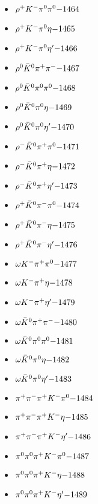 \begin{multicols}{3}
\begin{itemize}
 \item $ \rho^{+} K^{-} \pi^{0} \pi^{0} \hfill{-1464}$
 \item $ \rho^{+} K^{-} \pi^{0} \eta \hfill{-1465}$
 \item $ \rho^{+} K^{-} \pi^{0} {\eta^{\prime}} \hfill{-1466}$
 \item $ \rho^{0} \bar{K}^{0} \pi^{+} \pi^{-} \hfill{-1467}$
 \item $ \rho^{0} \bar{K}^{0} \pi^{0} \pi^{0} \hfill{-1468}$
 \item $ \rho^{0} \bar{K}^{0} \pi^{0} \eta \hfill{-1469}$
 \item $ \rho^{0} \bar{K}^{0} \pi^{0} {\eta^{\prime}} \hfill{-1470}$
 \item $ \rho^{-} \bar{K}^{0} \pi^{+} \pi^{0} \hfill{-1471}$
 \item $ \rho^{-} \bar{K}^{0} \pi^{+} \eta \hfill{-1472}$
 \item $ \rho^{-} \bar{K}^{0} \pi^{+} {\eta^{\prime}} \hfill{-1473}$
 \item $ \rho^{+} \bar{K}^{0} \pi^{-} \pi^{0} \hfill{-1474}$
 \item $ \rho^{+} \bar{K}^{0} \pi^{-} \eta \hfill{-1475}$
 \item $ \rho^{+} \bar{K}^{0} \pi^{-} {\eta^{\prime}} \hfill{-1476}$
 \item $ \omega K^{-} \pi^{+} \pi^{0} \hfill{-1477}$
 \item $ \omega K^{-} \pi^{+} \eta \hfill{-1478}$
 \item $ \omega K^{-} \pi^{+} {\eta^{\prime}} \hfill{-1479}$
 \item $ \omega \bar{K}^{0} \pi^{+} \pi^{-} \hfill{-1480}$
 \item $ \omega \bar{K}^{0} \pi^{0} \pi^{0} \hfill{-1481}$
 \item $ \omega \bar{K}^{0} \pi^{0} \eta \hfill{-1482}$
 \item $ \omega \bar{K}^{0} \pi^{0} {\eta^{\prime}} \hfill{-1483}$
 \item $ \pi^{+} \pi^{-} \pi^{+} K^{-} \pi^{0} \hfill{-1484}$
 \item $ \pi^{+} \pi^{-} \pi^{+} K^{-} \eta \hfill{-1485}$
 \item $ \pi^{+} \pi^{-} \pi^{+} K^{-} {\eta^{\prime}} \hfill{-1486}$
 \item $ \pi^{0} \pi^{0} \pi^{+} K^{-} \pi^{0} \hfill{-1487}$
 \item $ \pi^{0} \pi^{0} \pi^{+} K^{-} \eta \hfill{-1488}$
 \item $ \pi^{0} \pi^{0} \pi^{+} K^{-} {\eta^{\prime}} \hfill{-1489}$

\end{itemize}
\end{multicols}
